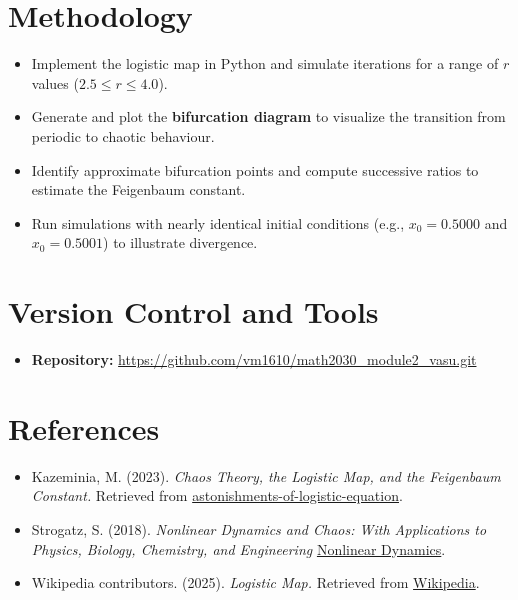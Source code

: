\documentclass[12pt]{article}
\begin{document}
\section{Methodology}

\begin{itemize}
     

    \item Implement the logistic map in Python and simulate iterations for a range of \(r\) values (\(2.5 \leq r \leq 4.0\)).
    \item Generate and plot the \textbf{bifurcation diagram} to visualize the transition from periodic to chaotic behaviour.
    \item Identify approximate bifurcation points and compute successive ratios to estimate the Feigenbaum constant.
    \item Run simulations with nearly identical initial conditions (e.g., \(x_0 = 0.5000\) and \(x_0 = 0.5001\)) to illustrate divergence.
\end{itemize}
\section{Version Control and Tools}

    \begin{itemize}
    \item \textbf{Repository:} \url{https://github.com/vm1610/math2030_module2_vasu.git}
    \end{itemize}

\section{References}
\begin{itemize}


    \item Kazeminia, M. (2023). \textit{Chaos Theory, the Logistic Map, and the Feigenbaum Constant.} Retrieved from \href{https://mehrankazeminia.medium.com/astonishments-of-logistic-equation-feigenbaum-constant-c725b0866d80}{astonishments-of-logistic-equation}.
    \item Strogatz, S. (2018). \textit{Nonlinear Dynamics and Chaos: With Applications to Physics, Biology, Chemistry, and Engineering} \href{https://www.biodyn.ro/course/literatura/Nonlinear_Dynamics_and_Chaos_2018_Steven_H._Strogatz.pdf} {Nonlinear Dynamics}.
    \item Wikipedia contributors. (2025). \textit{Logistic Map.} Retrieved from \href{https://en.wikipedia.org/wiki/Logistic_map}{Wikipedia}.
\end{itemize}
\end{document}
